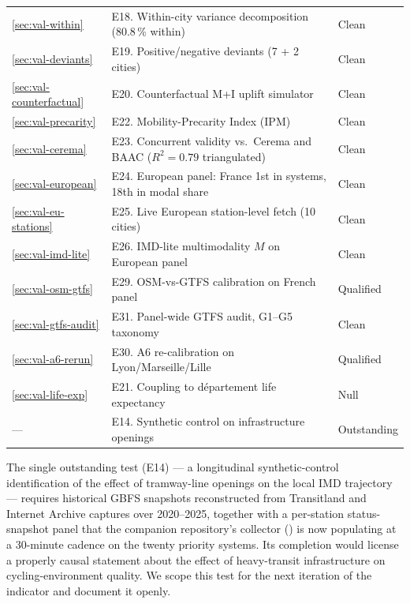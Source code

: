 \documentclass[11pt,a4paper]{article}
\begin{document}
\begin{table}[H]
\begin{tabular}{@{}lp{7.6cm}l@{}}
\ref{sec:val-within}         & E18. Within-city variance decomposition (80.8\,\% within) & Clean \\
\ref{sec:val-deviants}       & E19. Positive/negative deviants (7 + 2 cities) & Clean \\
\ref{sec:val-counterfactual} & E20. Counterfactual M+I uplift simulator & Clean \\
\ref{sec:val-precarity}      & E22. Mobility-Precarity Index (IPM) & Clean \\
\ref{sec:val-cerema}         & E23. Concurrent validity vs.\ Cerema and BAAC ($R^{2} = 0.79$ triangulated) & Clean \\
\ref{sec:val-european}       & E24. European panel: France 1st in systems, 18th in modal share & Clean \\
\ref{sec:val-eu-stations}    & E25. Live European station-level fetch (10 cities) & Clean \\
\ref{sec:val-imd-lite}       & E26. IMD-lite multimodality $M$ on European panel & Clean \\
\ref{sec:val-osm-gtfs}       & E29. OSM-vs-GTFS calibration on French panel & Qualified \\
\ref{sec:val-gtfs-audit}     & E31. Panel-wide GTFS audit, G1--G5 taxonomy & Clean \\
\ref{sec:val-a6-rerun}       & E30. A6 re-calibration on Lyon/Marseille/Lille & Qualified \\
\ref{sec:val-life-exp}       & E21. Coupling to département life expectancy & Null \\
---                          & E14. Synthetic control on infrastructure openings & Outstanding \\
\bottomrule
\end{tabular}
\end{table}

The single outstanding test (E14) --- a longitudinal
synthetic-control identification of the effect of tramway-line
openings on the local IMD trajectory \citep{Abadie2010,
Abadie2021} --- requires historical GBFS snapshots reconstructed
from Transitland and Internet Archive captures over 2020--2025,
together with a per-station status-snapshot panel that the
companion repository's collector
() is now populating at a 30-minute
cadence on the twenty priority systems. Its completion would
license a properly causal statement about the effect of
heavy-transit infrastructure on cycling-environment quality. We
scope this test for the next iteration of the indicator and
document it openly.
\end{document}

